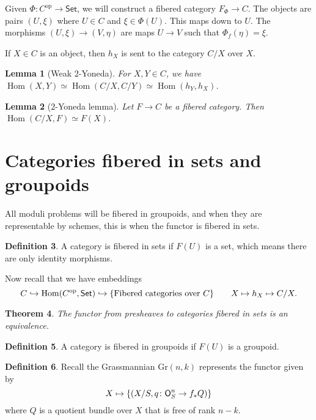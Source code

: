\documentclass[leqno, openany]{memoir}
\newtheorem{thm}{Theorem}[section]
\newtheorem{lem}[thm]{Lemma}
\theoremstyle{definition}
\newtheorem{defn}[thm]{Definition}
\theoremstyle{remark}
\theoremstyle{plain}
\theoremstyle{definition}
\theoremstyle{remark}
\newcommand{\mr}[1]{\mathrm{#1}}
\newcommand{\ms}[1]{\mathsf{#1}}
\DeclareMathOperator{\Hom}{Hom}
\begin{document}
Given $\Phi \colon C^{\mr{op}} \to \ms{Set}$, we will construct a fibered
category $F_{\Phi} \to C$. The objects are pairs $(U, \xi)$ where $U \in C$ and
$\xi \in \Phi(U)$. This maps down to $U$. The morphisms $(U, \xi) \to (V,
\eta)$ are maps $U \to V$ such that $\Phi_f(\eta) = \xi$.

If $X \in C$ is an object, then $h_X$ is sent to the category $C/X$ over $X$.

\begin{lem}[Weak $2$-Yoneda] For $X,Y \in C$, we have $\Hom(X,Y) \simeq
\Hom(C/X, C/Y) \simeq \Hom(h_Y, h_X)$.  \end{lem}

\begin{lem}[$2$-Yoneda lemma] Let $F \to C$ be a fibered category. Then
$\Hom(C/X, F) \simeq F(X)$.  \end{lem}

\section{Categories fibered in sets and groupoids}%
\label{sec:categories_fibered_in_sets_and_groupoids}

All moduli problems will be fibered in groupoids, and when they are
representable by schemes, this is when the functor is fibered in sets.

\begin{defn} A category is fibered in sets if $F(U)$ is a set, which means
there are only identity morphisms.  \end{defn}

Now recall that we have embeddings \[ C \hookrightarrow \Hom(C^{\mr{op}},
\ms{Set}) \hookrightarrow \qty{\text{Fibered categories over } C} \qquad X
\mapsto h_X \mapsto C/X. \]

\begin{thm} The functor from presheaves to categories fibered in sets is an
equivalence.  \end{thm}

\begin{defn} A category is fibered in groupoids if $F(U)$ is a groupoid.
\end{defn}

\begin{defn} Recall the Grassmannian $\mr{Gr}(n,k)$ represents the functor
    given by \[ X \mapsto \qty{(X/S, q \colon \ms{O}_S^n \to f_* Q)}\] where
$Q$ is a quotient bundle over $X$ that is free of rank $n-k$.  \end{defn}
\end{document}
